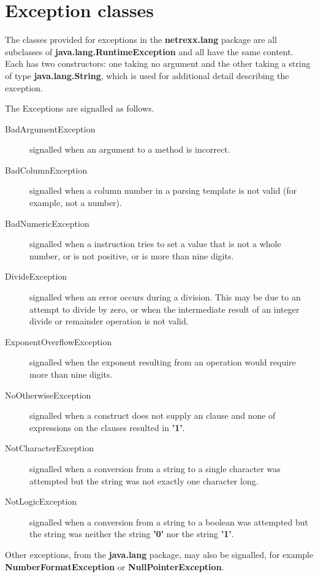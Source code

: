 \section{Exception classes}\label{refnlexcep}
 
The classes provided for exceptions in the \textbf{netrexx.lang} package
are all subclasses of \textbf{java.lang.RuntimeException} and all have
the same content.  Each has two constructors: one taking no argument and
the other taking a string of type \textbf{java.lang.String}, which is
used for additional detail describing the exception.
 
The Exceptions are signalled as follows.
\begin{description}
\item[BadArgumentException]\label{refexpbae}
 signalled when an argument to a method is incorrect.
\item[BadColumnException]\label{refexpbce}
 signalled when a column number in a parsing template is not valid
(for example, not a number).
\item[BadNumericException]\label{refexpbne}
 signalled when a  instruction tries to set
a value that is not a whole number, or is not positive, or is more than
nine digits.
\item[DivideException]\label{refexpdve}
 signalled when an error occurs during a division.  This may be due
to an attempt to divide by zero, or when the intermediate result of an
integer divide or remainder operation is not valid.
\item[ExponentOverflowException]\label{refexpeoe}
 signalled when the exponent resulting from an operation would
require more than nine digits.
\item[NoOtherwiseException]\label{refexpnoe}
 signalled when a  construct does not supply an
 clause and none of expressions on the 
clauses resulted in \textbf{'1'}.
\item[NotCharacterException]\label{refexpnce}
 signalled when a conversion from a string to a single character was
attempted but the string was not exactly one character long.
\item[NotLogicException]\label{refexpnle}
 signalled when a conversion from a string to a boolean was
attempted but the string was neither the string \textbf{'0'} nor the
string \textbf{'1'}.
\end{description}
 
Other exceptions, from the \textbf{java.lang} package, may also be
signalled, for example \textbf{NumberFormatException}
or \textbf{NullPointerException}.
